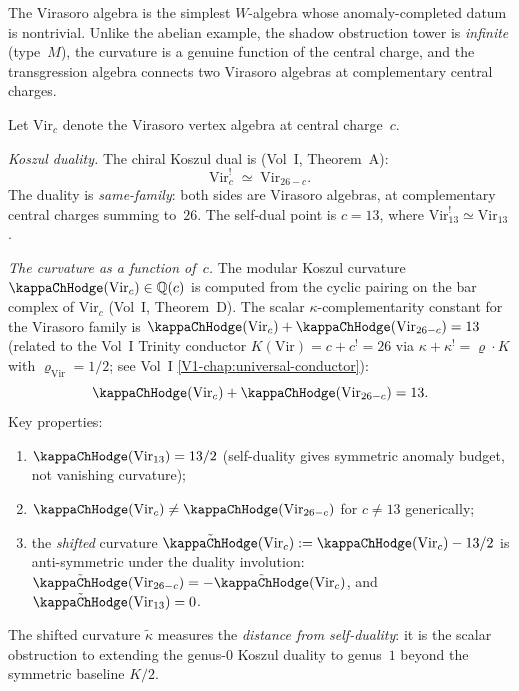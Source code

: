 The Virasoro algebra is the simplest $W$-algebra whose
anomaly-completed datum is nontrivial. Unlike the abelian
example, the shadow obstruction tower is \emph{infinite} (type~$M$), the
curvature is a genuine function of the central charge, and
the transgression algebra connects two Virasoro algebras at
complementary central charges.

\begin{computation}
\label{comp:virasoro-anomaly-completion}
Let $\mathrm{Vir}_c$ denote the Virasoro vertex algebra at
central charge~$c$.

\emph{Koszul duality.}
The chiral Koszul dual is
(Vol~I, Theorem~A):
\begin{equation}\label{eq:vir-koszul-dual}
\mathrm{Vir}_c^!
\;\simeq\;
\mathrm{Vir}_{26-c}.
\end{equation}
The duality is \emph{same-family}: both sides are Virasoro
algebras, at complementary central charges summing to~$26$.
The self-dual point is $c=13$, where
$\mathrm{Vir}_{13}^!\simeq\mathrm{Vir}_{13}$.

\emph{The curvature as a function of~$c$.}
The modular Koszul curvature $\kappaChHodge(\mathrm{Vir}_c)\in\mathbb Q(c)$
is computed from the cyclic pairing on the bar complex of
$\mathrm{Vir}_c$ (Vol~I, Theorem~D). The scalar $\kappa$-complementarity constant for the Virasoro
family is $\kappaChHodge(\mathrm{Vir}_c) + \kappaChHodge(\mathrm{Vir}_{26-c})
= 13$ (related to the Vol~I Trinity conductor
$K(\mathrm{Vir}) = c + c^{!} = 26$ via
$\kappa + \kappa^{!} = \varrho \cdot K$ with
$\varrho_{\mathrm{Vir}} = 1/2$; see Vol~I
\cref{V1-chap:universal-conductor}):
\begin{equation}\label{eq:vir-complementarity-vol2}
\kappaChHodge(\mathrm{Vir}_c) + \kappaChHodge(\mathrm{Vir}_{26-c}) = 13.
\end{equation}
Key properties:
\begin{enumerate}[label=\textup{(\roman*)}]
\item $\kappaChHodge(\mathrm{Vir}_{13})=13/2$ (self-duality gives
 symmetric anomaly budget, not vanishing curvature);
\item $\kappaChHodge(\mathrm{Vir}_c)\neq \kappaChHodge(\mathrm{Vir}_{26-c})$
 for $c\neq 13$ generically;
\item the \emph{shifted} curvature
 $\tilde\kappaChHodge(\mathrm{Vir}_c)
 := \kappaChHodge(\mathrm{Vir}_c) - 13/2$ is anti-symmetric under the
 duality involution:
 $\tilde\kappaChHodge(\mathrm{Vir}_{26-c})
 =-\tilde\kappaChHodge(\mathrm{Vir}_c)$,
 and $\tilde\kappaChHodge(\mathrm{Vir}_{13})=0$.
\end{enumerate}
The shifted curvature $\tilde\kappa$ measures the
\emph{distance from self-duality}: it is the scalar obstruction
to extending the genus-$0$ Koszul duality to genus~$1$
beyond the symmetric baseline $K/2$.


\end{computation}
